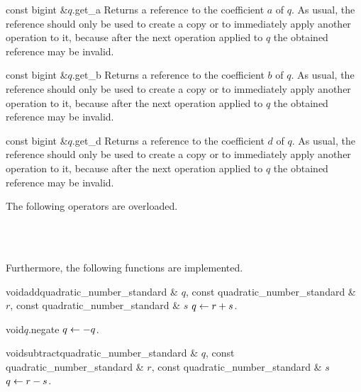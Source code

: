 \begin{cfcode}{const bigint &}{$q$.get_a}{}
  Returns a  reference to the coefficient $a$ of $q$.  As usual, the 
  reference should only be used to create a copy or to immediately apply another operation to
  it, because after the next operation applied to $q$ the obtained reference may be invalid.
\end{cfcode}

\begin{cfcode}{const bigint &}{$q$.get_b}{}
  Returns a  reference to the coefficient $b$ of $q$.  As usual, the 
  reference should only be used to create a copy or to immediately apply another operation to
  it, because after the next operation applied to $q$ the obtained reference may be invalid.
\end{cfcode}

\begin{cfcode}{const bigint &}{$q$.get_d}{}
  Returns a  reference to the coefficient $d$ of $q$.  As usual, the 
  reference should only be used to create a copy or to immediately apply another operation to
  it, because after the next operation applied to $q$ the obtained reference may be invalid.
\end{cfcode}



\ARTH

The following operators are overloaded.

\begin{center}
  \\
  \\
\end{center}

Furthermore, the following functions are implemented.

\begin{fcode}{void}{add}{quadratic_number_standard & $q$, const quadratic_number_standard & $r$,
    const quadratic_number_standard & $s$}%
  $q \leftarrow r + s$.
\end{fcode}

\begin{fcode}{void}{$q$.negate}{}
  $q \leftarrow -q$.
\end{fcode}

\begin{fcode}{void}{subtract}{quadratic_number_standard & $q$, const quadratic_number_standard & $r$,
    const quadratic_number_standard & $s$}%
  $q \leftarrow r - s$.
\end{fcode}

